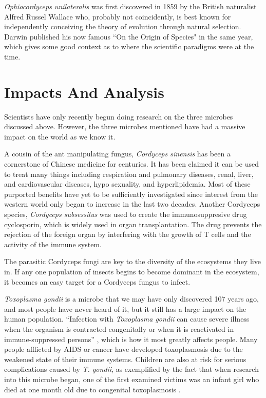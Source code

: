 \documentclass[twocolumn]{article}
\begin{document}
\textit{Ophiocordyceps unilateralis} was first discovered in 1859 by the British naturalist Alfred Russel Wallace who, probably not coincidently, is best known for independently conceiving the theory of evolution through natural selection. Darwin published his now famous ``On the Origin of Species" in the same year, which gives some good context as to where the scientific paradigms were at the time.\cite{darwin} 

\section*{Impacts And Analysis}

Scientists have only recently begun doing research on the three microbes discussed above. However, the three microbes mentioned have had a massive impact on the world as we know it. 

A cousin of the ant manipulating fungus, \textit{Cordyceps sinensis} has been a cornerstone of Chinese medicine for centuries. It has been claimed it can be used to treat many things including respiration and pulmonary diseases, renal, liver, and cardiovascular diseases, hypo sexuality, and hyperlipidemia. Most of these purported benefits have yet to be sufficiently investigated since interest from the western world only began to increase in the last two decades. \cite{medicinal_cordy} Another Cordyceps species, \textit{Cordyceps subsessilus} was used to create the immunosuppresive drug cyclosporin, which is widely used in organ transplantation. The drug prevents the rejection of the foreign organ by interfering with the growth of T cells and the activity of the immune system.\cite{cordy_tcells}

The parasitic Cordyceps fungi are key to the diversity of the ecosystems they live in. If any one population of insects begins to become dominant in the ecosystem, it becomes an easy target for a Cordyceps fungus to infect.  \cite{cordy_video}

\textit{Toxoplasma gondii} is a microbe that we may have only discovered 107 years ago, and most people have never heard of it, but it still has a large impact on the human population. ``Infection with \textit{Toxoplasma gondii} can cause severe illness when the organism is contracted congenitally or when it is reactivated in immune-suppressed persons” \cite{Tsero}, which is how it most greatly affects people. Many people afflicted by AIDS or cancer have developed toxoplasmosis due to the weakened state of their immune systems. Children are also at risk for serious complications caused by \textit{T. gondii}, as exemplified by the fact that when research into this microbe began, one of the first examined victims was an infant girl who died at one month old due to congenital toxoplasmosis \cite{Tlife_cycle}.
\end{document}
